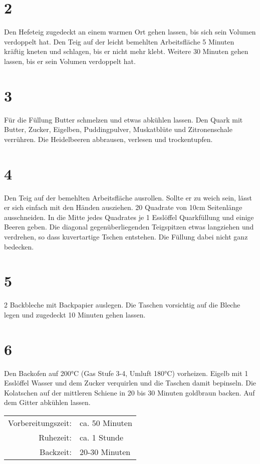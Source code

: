 \documentclass[twocolumn,11pt,a4paper,german]{article}
\begin{document}
\section*{2}
Den Hefeteig zugedeckt an einem warmen Ort gehen lassen, bis sich sein Volumen
verdoppelt hat. Den Teig auf der leicht bemehlten Arbeitsfläche 5 Minuten
kräftig kneten und schlagen, bis er nicht mehr klebt. Weitere 30 Minuten gehen
lassen, bis er sein Volumen verdoppelt hat.
\section*{3}
Für die Füllung Butter schmelzen und etwas abkühlen lassen. Den Quark mit
Butter, Zucker, Eigelben, Puddingpulver, Muskatblüte und Zitronenschale
verrühren. Die Heidelbeeren abbrausen, verlesen und trockentupfen.
\section*{4}
Den Teig auf der bemehlten Arbeitsfläche ausrollen. Sollte er zu weich sein,
lässt er sich einfach mit den Händen ausziehen. 20 Quadrate von 10cm Seitenlänge
ausschneiden. In die Mitte jedes Quadrates je 1 Esslöffel Quarkfüllung und
einige Beeren geben. Die diagonal gegenüberliegenden Teigspitzen etwas
langziehen und verdrehen, so dass kuvertartige Tschen entstehen. Die Füllung
dabei nicht ganz bedecken.
\section*{5}
2 Backbleche mit Backpapier auslegen. Die Taschen vorsichtig auf die Bleche
legen und zugedeckt 10 Minuten gehen lassen.
\section*{6}
Den Backofen auf 200°C (Gas Stufe 3-4, Umluft 180°C) vorheizen. Eigelb mit 1
Esslöffel Wasser und dem Zucker verquirlen und die Taschen damit bepinseln. Die
Kolatschen auf der mittleren Schiene in 20 bis 30 Minuten goldbraun backen. Auf
dem Gitter abkühlen lassen.
\vfill
\noindent\hrulefill
\vfill
\noindent
\flushright
\begin{tabular}{rl}
	Vorbereitungszeit: & ca. 50 Minuten \\
	Ruhezeit: & ca. 1 Stunde \\
	Backzeit: & 20-30 Minuten
\end{tabular}
\end{document}
